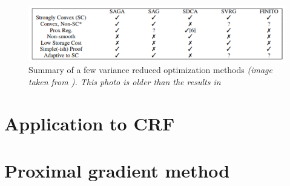 \documentclass[12pt]{report}
\begin{document}
\begin{figure}[h]
    \centering
    \includegraphics[scale=1]{Image/summary.PNG}
    \caption{Summary of a few variance reduced optimization methods \textit{(image taken from \cite{DefazioBL14}). This photo is older than the results in \cite{Hofmann2015}}}
    \label{fig:fig2}
\end{figure}

\section{Application to CRF}

\section{Proximal gradient method}


\end{document}
